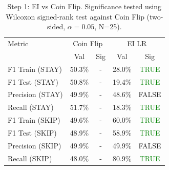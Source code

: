 \begin{table}[ht]
\centering
\begin{tabular}{lcccc}
\hline
Metric & \multicolumn{2}{c}{Coin Flip} & \multicolumn{2}{c}{EI LR} \\
 & Val & Sig & Val & Sig \\
\hline
F1 Train (STAY) & 50.3\% & - & 28.0\% & \textcolor{green}{TRUE} \\
F1 Test (STAY) & 50.8\% & - & 19.4\% & \textcolor{green}{TRUE} \\
Precision (STAY) & 49.9\% & - & 48.6\% & FALSE \\
Recall (STAY) & 51.7\% & - & 18.3\% & \textcolor{green}{TRUE} \\
F1 Train (SKIP) & 49.6\% & - & 60.0\% & \textcolor{green}{TRUE} \\
F1 Test (SKIP) & 48.9\% & - & 58.9\% & \textcolor{green}{TRUE} \\
Precision (SKIP) & 49.9\% & - & 49.9\% & FALSE \\
Recall (SKIP) & 48.0\% & - & 80.9\% & \textcolor{green}{TRUE} \\
\hline
\end{tabular}
\caption{Step 1: EI vs Coin Flip. Significance tested using Wilcoxon signed-rank test against Coin Flip (two-sided, $\alpha=0.05$, N=25).}
\label{tab:metrics_inter_1}
\end{table}